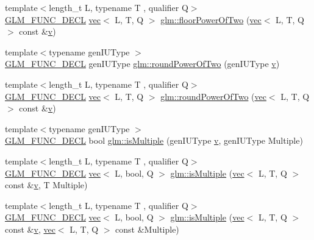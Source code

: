 \begin{DoxyCompactItemize}
\item 
{\footnotesize template$<$length\+\_\+t L, typename T , qualifier Q$>$ }\\\hyperlink{setup_8hpp_ab2d052de21a70539923e9bcbf6e83a51}{G\+L\+M\+\_\+\+F\+U\+N\+C\+\_\+\+D\+E\+CL} \hyperlink{structglm_1_1vec}{vec}$<$ L, T, Q $>$ \hyperlink{group__gtc__round_gaf0d591a8fca8ddb9289cdeb44b989c2d}{glm\+::floor\+Power\+Of\+Two} (\hyperlink{structglm_1_1vec}{vec}$<$ L, T, Q $>$ const \&\hyperlink{_s_d_l__opengl_8h_a10a82eabcb59d2fcd74acee063775f90}{v})
\item 
{\footnotesize template$<$typename gen\+I\+U\+Type $>$ }\\\hyperlink{setup_8hpp_ab2d052de21a70539923e9bcbf6e83a51}{G\+L\+M\+\_\+\+F\+U\+N\+C\+\_\+\+D\+E\+CL} gen\+I\+U\+Type \hyperlink{group__gtc__round_gae4e1bf5d1cd179f59261a7342bdcafca}{glm\+::round\+Power\+Of\+Two} (gen\+I\+U\+Type \hyperlink{_s_d_l__opengl_8h_a10a82eabcb59d2fcd74acee063775f90}{v})
\item 
{\footnotesize template$<$length\+\_\+t L, typename T , qualifier Q$>$ }\\\hyperlink{setup_8hpp_ab2d052de21a70539923e9bcbf6e83a51}{G\+L\+M\+\_\+\+F\+U\+N\+C\+\_\+\+D\+E\+CL} \hyperlink{structglm_1_1vec}{vec}$<$ L, T, Q $>$ \hyperlink{group__gtc__round_ga258802a7d55c03c918f28cf4d241c4d0}{glm\+::round\+Power\+Of\+Two} (\hyperlink{structglm_1_1vec}{vec}$<$ L, T, Q $>$ const \&\hyperlink{_s_d_l__opengl_8h_a10a82eabcb59d2fcd74acee063775f90}{v})
\item 
{\footnotesize template$<$typename gen\+I\+U\+Type $>$ }\\\hyperlink{setup_8hpp_ab2d052de21a70539923e9bcbf6e83a51}{G\+L\+M\+\_\+\+F\+U\+N\+C\+\_\+\+D\+E\+CL} bool \hyperlink{group__gtc__round_gaec593d33956a8fe43f78fccc63ddde9a}{glm\+::is\+Multiple} (gen\+I\+U\+Type \hyperlink{_s_d_l__opengl_8h_a10a82eabcb59d2fcd74acee063775f90}{v}, gen\+I\+U\+Type Multiple)
\item 
{\footnotesize template$<$length\+\_\+t L, typename T , qualifier Q$>$ }\\\hyperlink{setup_8hpp_ab2d052de21a70539923e9bcbf6e83a51}{G\+L\+M\+\_\+\+F\+U\+N\+C\+\_\+\+D\+E\+CL} \hyperlink{structglm_1_1vec}{vec}$<$ L, bool, Q $>$ \hyperlink{group__gtc__round_ga354caf634ef333d9cb4844407416256a}{glm\+::is\+Multiple} (\hyperlink{structglm_1_1vec}{vec}$<$ L, T, Q $>$ const \&\hyperlink{_s_d_l__opengl_8h_a10a82eabcb59d2fcd74acee063775f90}{v}, T Multiple)
\item 
{\footnotesize template$<$length\+\_\+t L, typename T , qualifier Q$>$ }\\\hyperlink{setup_8hpp_ab2d052de21a70539923e9bcbf6e83a51}{G\+L\+M\+\_\+\+F\+U\+N\+C\+\_\+\+D\+E\+CL} \hyperlink{structglm_1_1vec}{vec}$<$ L, bool, Q $>$ \hyperlink{group__gtc__round_gabb4360e38c0943d8981ba965dead519d}{glm\+::is\+Multiple} (\hyperlink{structglm_1_1vec}{vec}$<$ L, T, Q $>$ const \&\hyperlink{_s_d_l__opengl_8h_a10a82eabcb59d2fcd74acee063775f90}{v}, \hyperlink{structglm_1_1vec}{vec}$<$ L, T, Q $>$ const \&Multiple)

\end{DoxyCompactItemize}
